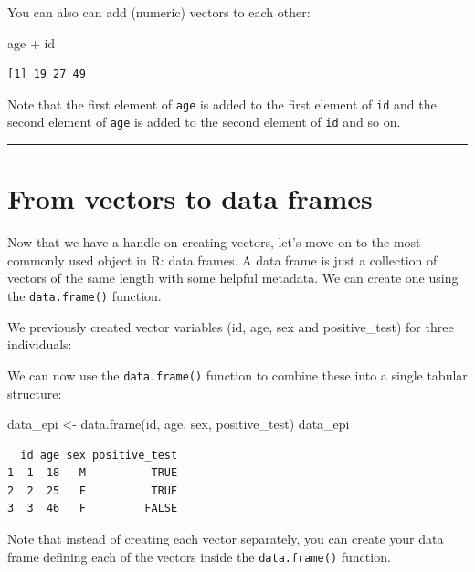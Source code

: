 \documentclass[
  letterpaper,
  DIV=11,
  numbers=noendperiod]{scrreprt}
\newenvironment{Shaded}{\begin{snugshade}}{\end{snugshade}}
\newcommand{\FunctionTok}[1]{\textcolor[rgb]{0.28,0.35,0.67}{#1}}
\newcommand{\NormalTok}[1]{\textcolor[rgb]{0.00,0.23,0.31}{#1}}
\newcommand{\OtherTok}[1]{\textcolor[rgb]{0.00,0.23,0.31}{#1}}
\newcommand{\SpecialCharTok}[1]{\textcolor[rgb]{0.37,0.37,0.37}{#1}}
\begin{document}
You can also can add (numeric) vectors to each other:

\begin{Shaded}
\begin{Highlighting}[]
\NormalTok{age }\SpecialCharTok{+}\NormalTok{ id}
\end{Highlighting}
\end{Shaded}

\begin{verbatim}
[1] 19 27 49
\end{verbatim}

Note that the first element of \texttt{age} is added to the first
element of \texttt{id} and the second element of \texttt{age} is added
to the second element of \texttt{id} and so on.

\begin{center}\rule{0.5\linewidth}{0.5pt}\end{center}

\section{From vectors to data frames}\label{from-vectors-to-data-frames}

Now that we have a handle on creating vectors, let's move on to the most
commonly used object in R: data frames. A data frame is just a
collection of vectors of the same length with some helpful metadata. We
can create one using the \texttt{data.frame()} function.

We previously created vector variables (id, age, sex and positive\_test)
for three individuals:

We can now use the \texttt{data.frame()} function to combine these into
a single tabular structure:

\begin{Shaded}
\begin{Highlighting}[]
\NormalTok{data\_epi }\OtherTok{\textless{}{-}} \FunctionTok{data.frame}\NormalTok{(id, age, sex, positive\_test)}
\NormalTok{data\_epi}
\end{Highlighting}
\end{Shaded}

\begin{verbatim}
  id age sex positive_test
1  1  18   M          TRUE
2  2  25   F          TRUE
3  3  46   F         FALSE
\end{verbatim}

Note that instead of creating each vector separately, you can create
your data frame defining each of the vectors inside the
\texttt{data.frame()} function.
\end{document}
